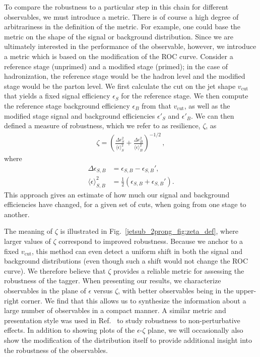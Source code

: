 \documentclass[11pt,letterpaper]{article}
\begin{document}
To compare the robustness to a
particular step in this chain for different observables, we must
introduce a metric.
%
There is of course a high degree of arbitrariness
in the definition of the metric.
%
For example, one could base the metric on the shape of the signal or background distribution.
%
Since we are ultimately interested in the performance of the observable, however, we introduce a metric which is based on the modification of the ROC curve.
%
Consider a reference stage (unprimed) and a modified stage (primed); in the case of hadronization, the reference stage would be the hadron level and the modified stage would be the parton level.
%
We first calculate the cut on the jet shape $v_{\text{cut}}$ that yields a fixed signal efficiency $\epsilon_S$ for the reference stage.
%
We then compute the reference stage background efficiency $\epsilon_B$ from that $v_{\text{cut}}$, as well as the modified stage signal and background efficiencies $\epsilon'_S$ and $\epsilon'_B$.
%
We can then defined a measure of robustness, which we refer to as resilience, $\zeta$, as
%
\begin{align}
\zeta=\left(  \frac{\Delta \epsilon_S^2}{ \langle \epsilon \rangle_S^2}  +\frac{\Delta \epsilon_B^2}{ \langle \epsilon \rangle_B^2}  \right)^{-1/2}\,,
\end{align}
%
where
%
\begin{align}
\Delta \epsilon_{S,B} & =\epsilon_{S,B}-\epsilon_{S,B}',\\
\langle \epsilon \rangle_{S,B}^2 & = \frac{1}{2} \left(\epsilon_{S,B} + \epsilon_{S,B}'\right).
\end{align}
%
This approach gives an estimate of how much our signal and background efficiencies have changed, for a given set of cuts, when going from one stage to another.

The meaning of $\zeta$ is illustrated in Fig.~\ref{jetsub_2prong_fig:zeta_def}, where larger values of $\zeta$ correspond to improved robustness.
%
Because we anchor to a fixed $v_{\text{cut}}$, this method can even detect a uniform shift in both the signal and background distributions (even though such a shift would not change the ROC curve).
%
We therefore believe that $\zeta$ provides a reliable metric for assessing the robustness of the tagger.
%
When presenting our results, we characterize observables
in the plane of $\epsilon$ versus $\zeta$, with better observables being in
the upper-right corner.
%
We find that this allows us to synthesize the
information about a large number of observables in a compact manner.
%
A
similar metric and presentation style was used in Ref.~\cite{Salam:2016yht}
to study robustness to non-perturbative effects.
%
In addition to
showing plots of the $\epsilon$-$\zeta$ plane, we will occasionally also show the modification of the distribution
itself to provide additional insight into the robustness of the
observables.
\end{document}
